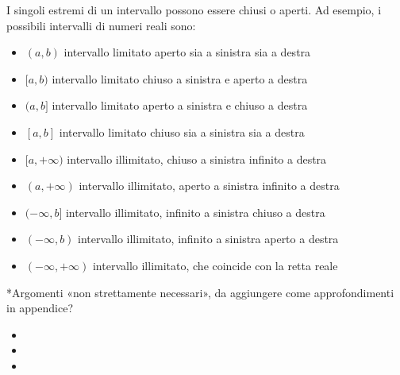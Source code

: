 \documentclass[letterpaper,10pt,italian]{jupyterBook}
\begin{document}
\sphinxAtStartPar
I singoli estremi di un intervallo possono essere chiusi o aperti. Ad esempio, i possibili intervalli di numeri reali sono:
\begin{itemize}
\item {} 
\sphinxAtStartPar
\((a,b)\) intervallo limitato aperto sia a sinistra sia a destra

\item {} 
\sphinxAtStartPar
\([a,b)\) intervallo limitato chiuso a sinistra e aperto a destra

\item {} 
\sphinxAtStartPar
\((a,b]\) intervallo limitato aperto a sinistra e chiuso a destra

\item {} 
\sphinxAtStartPar
\([a,b]\) intervallo limitato chiuso sia a sinistra sia a destra

\item {} 
\sphinxAtStartPar
\([a,+\infty)\) intervallo illimitato, chiuso a sinistra infinito a destra

\item {} 
\sphinxAtStartPar
\((a,+\infty)\) intervallo illimitato, aperto a sinistra infinito a destra

\item {} 
\sphinxAtStartPar
\((-\infty,b]\) intervallo illimitato, infinito a sinistra chiuso a destra

\item {} 
\sphinxAtStartPar
\((-\infty,b)\) intervallo illimitato, infinito a sinistra aperto a destra

\item {} 
\sphinxAtStartPar
\((-\infty,+\infty)\) intervallo illimitato, che coincide con la retta reale

\end{itemize}

\sphinxAtStartPar
{} *Argomenti «non strettamente necessari», da aggiungere come approfondimenti in appendice?
\begin{itemize}
\item {} 
\sphinxAtStartPar
{}

\item {} 
\sphinxAtStartPar
{}

\item {} 
\sphinxAtStartPar
{}

\end{itemize}
\end{document}
